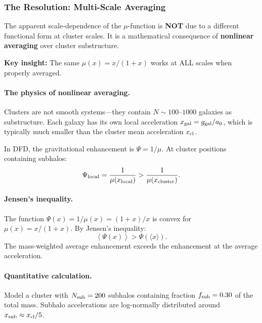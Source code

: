 \subsubsection{The Resolution: Multi-Scale Averaging}\label{sec:galactic-averaging}

\begin{tcolorbox}[colback=green!5!white, colframe=green!60!black, title=Breakthrough: Multi-Scale Averaging Resolution]
The apparent scale-dependence of the $\mu$-function is \textbf{NOT} due to a different functional form at cluster scales. It is a mathematical consequence of \textbf{nonlinear averaging} over cluster substructure.

\textbf{Key insight:} The same $\mu(x) = x/(1+x)$ works at ALL scales when properly averaged.
\end{tcolorbox}

\paragraph{The physics of nonlinear averaging.}
Clusters are not smooth systems---they contain $N \sim 100$--$1000$ galaxies as substructure. Each galaxy has its own local acceleration $x_{\rm gal} = g_{\rm gal}/a_0$, which is typically much smaller than the cluster mean acceleration $x_{\rm cl}$.

In DFD, the gravitational enhancement is $\Psi = 1/\mu$. At cluster positions containing subhalos:
\begin{equation}
\Psi_{\rm local} = \frac{1}{\mu(x_{\rm local})} > \frac{1}{\mu(x_{\rm cluster})}.
\end{equation}

\paragraph{Jensen's inequality.}
The function $\Psi(x) = 1/\mu(x) = (1+x)/x$ is convex for $\mu(x) = x/(1+x)$. By Jensen's inequality:
\begin{equation}
\left\langle \Psi(x) \right\rangle > \Psi\left(\langle x \rangle\right).
\end{equation}
The mass-weighted average enhancement exceeds the enhancement at the average acceleration.

\paragraph{Quantitative calculation.}
Model a cluster with $N_{\rm sub} = 200$ subhalos containing fraction $f_{\rm sub} = 0.30$ of the total mass. Subhalo accelerations are log-normally distributed around $x_{\rm sub} \approx x_{\rm cl}/5$.

